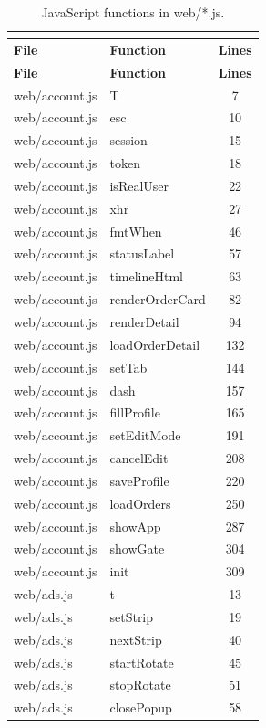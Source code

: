\begin{center}
\footnotesize
\begin{longtable}{@{}p{4.6cm}p{5.2cm}c@{}}
\caption{JavaScript functions in web/*.js.}\\
\label{tab:js}\\
\toprule
\textbf{File} & \textbf{Function} & \textbf{Lines} \\
\midrule
\endfirsthead
\toprule
\textbf{File} & \textbf{Function} & \textbf{Lines} \\
\midrule
\endhead
web/account.js & T & 7 \\
web/account.js & esc & 10 \\
web/account.js & session & 15 \\
web/account.js & token & 18 \\
web/account.js & isRealUser & 22 \\
web/account.js & xhr & 27 \\
web/account.js & fmtWhen & 46 \\
web/account.js & statusLabel & 57 \\
web/account.js & timelineHtml & 63 \\
web/account.js & renderOrderCard & 82 \\
web/account.js & renderDetail & 94 \\
web/account.js & loadOrderDetail & 132 \\
web/account.js & setTab & 144 \\
web/account.js & dash & 157 \\
web/account.js & fillProfile & 165 \\
web/account.js & setEditMode & 191 \\
web/account.js & cancelEdit & 208 \\
web/account.js & saveProfile & 220 \\
web/account.js & loadOrders & 250 \\
web/account.js & showApp & 287 \\
web/account.js & showGate & 304 \\
web/account.js & init & 309 \\
web/ads.js & t & 13 \\
web/ads.js & setStrip & 19 \\
web/ads.js & nextStrip & 40 \\
web/ads.js & startRotate & 45 \\
web/ads.js & stopRotate & 51 \\
web/ads.js & closePopup & 58 \\

\end{longtable}
\end{center}
